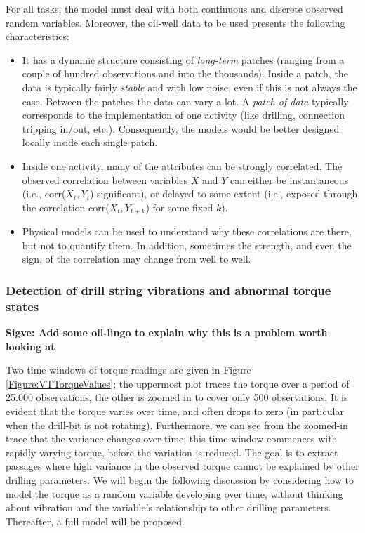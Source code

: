 For all tasks, the model must deal with both continuous and discrete observed random variables. Moreover, the oil-well data to be used presents the following characteristics: 

\begin{itemize}

\item It has a dynamic structure consisting of \emph{long-term} patches (ranging from a couple of hundred observations and into the thousands). Inside a patch, the data is typically fairly \emph{stable} and with low noise, even if this is not always the case. Between the patches the data can vary a lot. A \emph{patch of data} typically corresponds to the implementation of one activity (like drilling, connection tripping in/out, etc.). Consequently, the models would be better designed locally inside each single patch.

\item Inside one activity, many of the attributes can be strongly correlated. The observed correlation between variables $X$ and $Y$ can either be instantaneous (i.e., corr($X_t, Y_t$) significant), or delayed to some extent (i.e., exposed through the correlation corr($X_t, Y_{t+k}$) for some fixed $k$).

\item Physical models can be used to understand why these correlations are there, but not to quantify them. In addition, sometimes the strength, and even the sign, of the correlation may change from well to well.

\end{itemize}



\subsubsection{Detection of drill string vibrations and abnormal torque states}

{\bf Sigve: Add some oil-lingo to explain why this is a problem worth looking at}




Two time-windows of torque-readings are given in Figure \ref{Figure:VTTorqueValues}; the uppermost plot traces the torque over a period of 25.000 observations, the other is zoomed in to cover only 500 observations. It is evident that the torque varies over time, and often drops to zero (in particular when the drill-bit is not rotating). Furthermore, we can see from the zoomed-in trace that the variance changes over time; this time-window commences with rapidly varying torque, before the variation is reduced. The goal is to extract passages where high variance in the observed torque cannot be explained by other drilling parameters. 
We will begin the following discussion by considering how to model the torque as a random variable developing over time, without thinking about vibration and the variable's relationship to other drilling parameters.   
Thereafter, a full model will be proposed.

